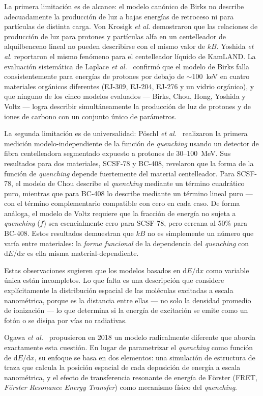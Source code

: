 \documentclass[11pt,a4paper]{article}
\begin{document}
La primera limitación es de alcance: el modelo canónico de Birks no describe adecuadamente la producción de luz a bajas energías de retroceso ni para partículas de distinta carga. Von Krosigk \textit{et al.} demostraron que las relaciones de producción de luz para protones y partículas alfa en un centelleador de alquilbenceno lineal no pueden describirse con el mismo valor de $kB$. Yoshida \textit{et al.} reportaron el mismo fenómeno para el centelleador líquido de KamLAND. La evaluación sistemática de Laplace \textit{et al.}~\cite{laplace2022} confirmó que el modelo de Birks falla consistentemente para energías de protones por debajo de $\sim$100~keV en cuatro materiales orgánicos diferentes (EJ-309, EJ-204, EJ-276 y un vidrio orgánico), y que ninguno de los cinco modelos evaluados --- Birks, Chou, Hong, Yoshida y Voltz --- logra describir simultáneamente la producción de luz de protones y de iones de carbono con un conjunto único de parámetros.

La segunda limitación es de universalidad: Pöschl \textit{et al.}~\cite{poeschl2020} realizaron la primera medición modelo-independiente de la función de \textit{quenching} usando un detector de fibra centelleadora segmentado expuesto a protones de 30--100~MeV. Sus resultados para dos materiales, SCSF-78 y BC-408, revelaron que la forma de la función de \textit{quenching} depende fuertemente del material centelleador. Para SCSF-78, el modelo de Chou describe el \textit{quenching} mediante un término cuadrático puro, mientras que para BC-408 lo describe mediante un término lineal puro --- con el término complementario compatible con cero en cada caso. De forma análoga, el modelo de Voltz requiere que la fracción de energía no sujeta a \textit{quenching} ($f$) sea esencialmente cero para SCSF-78, pero cercana al 50\% para BC-408. Estos resultados demuestran que $kB$ no es simplemente un número que varía entre materiales: la \textit{forma funcional} de la dependencia del \textit{quenching} con $\mathrm{d}E/\mathrm{d}x$ es ella misma material-dependiente.

Estas observaciones sugieren que los modelos basados en $\mathrm{d}E/\mathrm{d}x$ como variable única están incompletos. Lo que falta es una descripción que considere explícitamente la distribución espacial de las moléculas excitadas a escala nanométrica, porque es la distancia entre ellas --- no solo la densidad promedio de ionización --- lo que determina si la energía de excitación se emite como un fotón o se disipa por vías no radiativas.

Ogawa \textit{et al.}~\cite{ogawa2018} propusieron en 2018 un modelo radicalmente diferente que aborda exactamente esta cuestión. En lugar de parametrizar el \textit{quenching} como función de $\mathrm{d}E/\mathrm{d}x$, su enfoque se basa en dos elementos: una simulación de estructura de traza que calcula la posición espacial de cada deposición de energía a escala nanométrica, y el efecto de transferencia resonante de energía de Förster (FRET, \textit{Förster Resonance Energy Transfer}) como mecanismo físico del \textit{quenching}.
\end{document}
